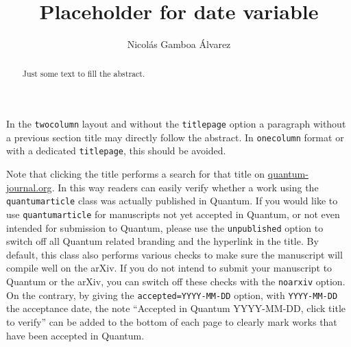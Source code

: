 \documentclass[a4paper, twocolumn, 11pt, paperequity]{gorgona}
\newcommand{\todaydate}{Placeholder for date variable}
\begin{document}

\vspace*{5cm}

\title{\todaydate}
\author{Nicolás Gamboa Álvarez}

\maketitle

\begin{abstract}
    Just some text to fill the abstract.
\end{abstract}

In the \texttt{twocolumn} layout and without the \texttt{titlepage} option a paragraph without a previous section title may directly follow the abstract.
In \texttt{onecolumn} format or with a dedicated \texttt{titlepage}, this should be avoided.

Note that clicking the title performs a search for that title on \href{http://quantum-journal.org}{quantum-journal.org}.
In this way readers can easily verify whether a work using the \texttt{quantumarticle} class was actually published in Quantum.
If you would like to use \texttt{quantumarticle} for manuscripts not yet accepted in Quantum, or not even intended for submission to Quantum, please use the \texttt{unpublished} option to switch off all Quantum related branding and the hyperlink in the title.
By default, this class also performs various checks to make sure the manuscript will compile well on the arXiv.
If you do not intend to submit your manuscript to Quantum or the arXiv, you can switch off these checks with the \texttt{noarxiv} option.
On the contrary, by giving the \texttt{accepted=YYYY-MM-DD} option, with \texttt{YYYY-MM-DD} the acceptance date, the note ``Accepted in Quantum YYYY-MM-DD, click title to verify'' can be added to the bottom of each page to clearly mark works that have been accepted in Quantum.
\end{document}
